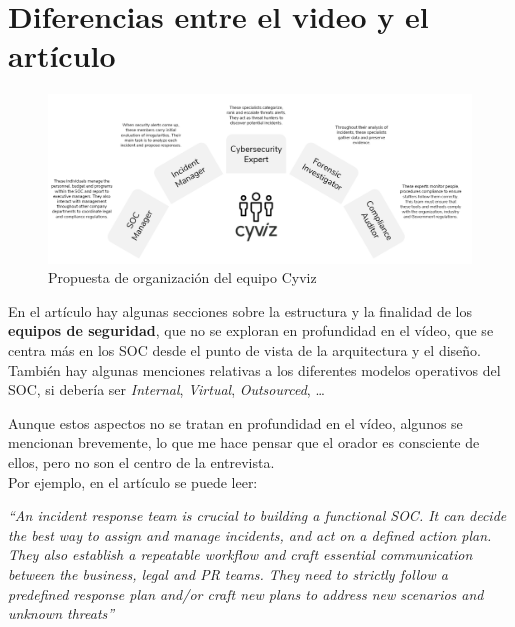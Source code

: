 
\section{Diferencias entre el video y el artículo}
\begin{paracol}{2}
   

   \begin{figure}[htbp]
      \centering
      \includegraphics[width=0.95\columnwidth]{images/06/cyvizTeam.png}
      \caption{Propuesta de organización del equipo Cyviz}
      \label{fig:06/cyvizTeam}
   \end{figure}
   \switchcolumn
   \colfill
   En el artículo hay algunas secciones sobre la estructura y la finalidad de los \textbf{equipos de seguridad}, que no se exploran en profundidad en el vídeo, que se centra más en los SOC desde el punto de vista de la arquitectura y el diseño.\\
   También hay algunas menciones relativas a los diferentes modelos operativos del SOC, si debería ser \textit{Internal}, \textit{Virtual}, \textit{Outsourced}, \dots
   \colfill
\end{paracol}

Aunque estos aspectos no se tratan en profundidad en el vídeo, algunos se mencionan brevemente, lo que me hace pensar que el orador es consciente de ellos, pero no son el centro de la entrevista.\\
Por ejemplo, en el artículo se puede leer:
\begin{center}
   \textit{``An incident response team is crucial to building a functional SOC. It can decide the best way to assign and manage incidents, and
   act on a defined action plan. They also establish a repeatable workflow and craft essential communication between the business,
   legal and PR teams. They need to strictly follow a predefined response plan and/or craft new plans to address new scenarios and
   unknown threats''}
\end{center}


